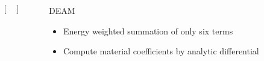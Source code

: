 \documentclass[compress]{beamer}
\begin{document}
\begin{frame}
\begin{columns}[totalwidth=\textwidth]
\begin{column}{.65\textwidth}
\begin{equation*}
\begin{bmatrix}
\end{bmatrix} 
	\end{equation*}
	\end{column}
	\begin{column}{.33\textwidth} 
   \begin{exampleblock}{DEAM}
	\begin{itemize}[label=$\boxed{\color{green} \checkmark}$, font=\small, leftmargin=*]
	\item Energy weighted summation of only six terms
	\item Compute material coefficients by analytic differential
	\end{itemize}
	\end{exampleblock}
   \end{column}
\end{columns}
\end{frame}
\end{document}

